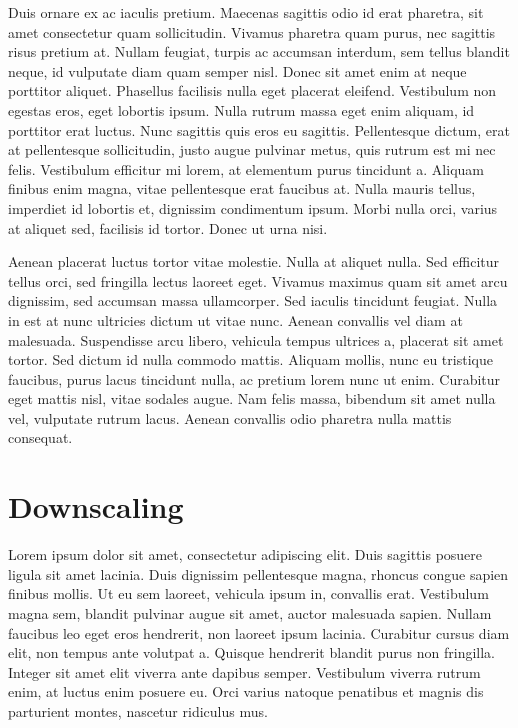 \documentclass[
  letterpaper,
  DIV=11,
  numbers=noendperiod]{scrreprt}
\begin{document}
Duis ornare ex ac iaculis pretium. Maecenas sagittis odio id erat
pharetra, sit amet consectetur quam sollicitudin. Vivamus pharetra quam
purus, nec sagittis risus pretium at. Nullam feugiat, turpis ac accumsan
interdum, sem tellus blandit neque, id vulputate diam quam semper nisl.
Donec sit amet enim at neque porttitor aliquet. Phasellus facilisis
nulla eget placerat eleifend. Vestibulum non egestas eros, eget lobortis
ipsum. Nulla rutrum massa eget enim aliquam, id porttitor erat luctus.
Nunc sagittis quis eros eu sagittis. Pellentesque dictum, erat at
pellentesque sollicitudin, justo augue pulvinar metus, quis rutrum est
mi nec felis. Vestibulum efficitur mi lorem, at elementum purus
tincidunt a. Aliquam finibus enim magna, vitae pellentesque erat
faucibus at. Nulla mauris tellus, imperdiet id lobortis et, dignissim
condimentum ipsum. Morbi nulla orci, varius at aliquet sed, facilisis id
tortor. Donec ut urna nisi.

Aenean placerat luctus tortor vitae molestie. Nulla at aliquet nulla.
Sed efficitur tellus orci, sed fringilla lectus laoreet eget. Vivamus
maximus quam sit amet arcu dignissim, sed accumsan massa ullamcorper.
Sed iaculis tincidunt feugiat. Nulla in est at nunc ultricies dictum ut
vitae nunc. Aenean convallis vel diam at malesuada. Suspendisse arcu
libero, vehicula tempus ultrices a, placerat sit amet tortor. Sed dictum
id nulla commodo mattis. Aliquam mollis, nunc eu tristique faucibus,
purus lacus tincidunt nulla, ac pretium lorem nunc ut enim. Curabitur
eget mattis nisl, vitae sodales augue. Nam felis massa, bibendum sit
amet nulla vel, vulputate rutrum lacus. Aenean convallis odio pharetra
nulla mattis consequat.

\chapter{Downscaling}\label{downscaling}

Lorem ipsum dolor sit amet, consectetur adipiscing elit. Duis sagittis
posuere ligula sit amet lacinia. Duis dignissim pellentesque magna,
rhoncus congue sapien finibus mollis. Ut eu sem laoreet, vehicula ipsum
in, convallis erat. Vestibulum magna sem, blandit pulvinar augue sit
amet, auctor malesuada sapien. Nullam faucibus leo eget eros hendrerit,
non laoreet ipsum lacinia. Curabitur cursus diam elit, non tempus ante
volutpat a. Quisque hendrerit blandit purus non fringilla. Integer sit
amet elit viverra ante dapibus semper. Vestibulum viverra rutrum enim,
at luctus enim posuere eu. Orci varius natoque penatibus et magnis dis
parturient montes, nascetur ridiculus mus.
\end{document}
